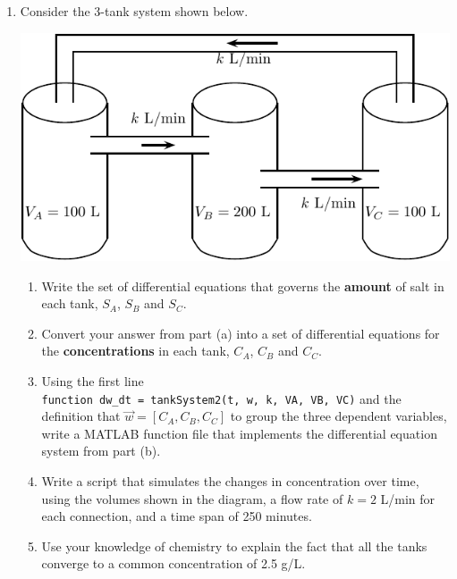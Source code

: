 \begin{enumerate}[1.]
\item
\begin{Question}
  Consider the 3-tank system shown below.
\begin{center}
\includegraphics[width=0.65\linewidth]{graphics/Week09_TankSystems/TankDiagram2} 
\end{center}
\begin{enumerate}
\item Write the set of differential equations that governs the {\bf
    amount} of salt in each tank, $S_A$, $S_B$ and $S_C$.
\item Convert your answer from part (a) into a set of differential
  equations for the {\bf concentrations} in each tank, $C_A$, $C_B$
  and $C_C$.
\item Using the first line \\
  \verb#function dw_dt = tankSystem2(t, w, k, VA, VB, VC)# and the
  definition that $\vec{w} = [C_A, C_B, C_C]$ to group the three
  dependent variables, write a MATLAB function file that implements
  the differential equation system from part (b).
\item Write a script that simulates the changes in concentration over
  time, using the volumes shown in the diagram, a flow rate of $k = 2$
  L/min for each connection, and a time span of 250 minutes.

\item Use your knowledge of chemistry to explain the fact that all the
  tanks converge to a common concentration of 2.5 g/L.
\end{enumerate}
\end{Question}


\end{enumerate}
